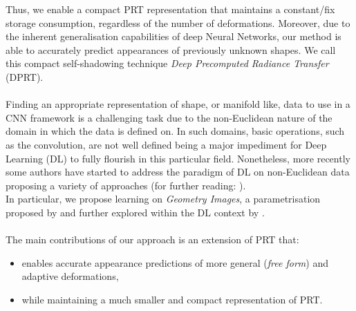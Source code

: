 Thus, we enable a compact PRT representation that maintains a constant/fix storage consumption, regardless of the number of deformations. Moreover, due to the inherent generalisation capabilities of deep Neural Networks, our method is able to accurately predict appearances of previously unknown shapes. We call this compact self-shadowing technique \textit{Deep Precomputed Radiance Transfer} (DPRT). \\
\\
Finding an appropriate representation of shape, or manifold like, data to use in a CNN framework is a challenging task due to the non-Euclidean nature of the domain in which the data is defined on. In such domains, basic operations, such as the convolution, are not well defined being a major impediment for Deep Learning (DL) to fully flourish in this particular field. Nonetheless, more recently some authors have started to address the paradigm of DL on non-Euclidean data proposing a variety of approaches \cite{Masci2015ShapeNetCN, Geometric_deep_learning, CNN_on_Torus} (for further reading: \cite{GeoDeepLearning}). \\
In particular, we propose learning on \textit{Geometry Images}, a parametrisation proposed by \citep{gu2002geometry} and further explored within the DL context by \cite{sinha2016deep}.   
\\
\\
The main contributions of our approach is an extension of PRT that:
\begin{itemize}
\item enables accurate appearance predictions of more general (\textit{free form}) and adaptive deformations,
\item while maintaining a much smaller and compact representation of PRT. 
\end{itemize}
